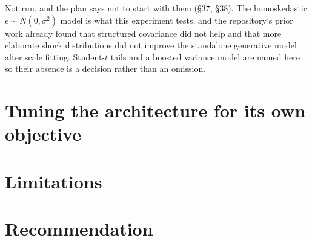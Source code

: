 \documentclass[11pt,a4paper]{article}
\begin{document}
Not run, and the plan says not to start with them (§37, §38). The homoskedastic
$\epsilon \sim N(0,\sigma^2)$ model is what this experiment tests, and the repository's prior
work already found that structured covariance did not help and that more elaborate shock
distributions did not improve the standalone generative model after scale fitting. Student-$t$
tails and a boosted variance model are named here so their absence is a decision rather than an
omission.

\section{Tuning the architecture for its own objective}



\section{Limitations}



\section{Recommendation}


\end{document}
